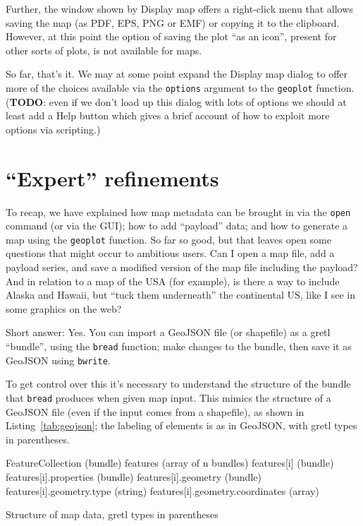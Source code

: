 \documentclass{article}
\begin{document}
Further, the window shown by \textsf{Display map} offers a right-click
menu that allows saving the map (as PDF, EPS, PNG or EMF) or copying
it to the clipboard. However, at this point the option of saving the
plot ``as an icon'', present for other sorts of plots, is not
available for maps.

So far, that's it. We may at some point expand the \textsf{Display
  map} dialog to offer more of the choices available via the
\texttt{options} argument to the \texttt{geoplot}
function. (\textbf{TODO}: even if we don't load up this dialog with
lots of options we should at least add a \textsf{Help} button which
gives a brief account of how to exploit more options via scripting.)

\section{``Expert'' refinements}
\label{sec:expert}

To recap, we have explained how map metadata can be brought in via the
\texttt{open} command (or via the GUI); how to add ``payload'' data;
and how to generate a map using the \texttt{geoplot} function. So far
so good, but that leaves open some questions that might occur to
ambitious users.  Can I open a map file, add a payload series, and
save a modified version of the map file including the payload? And in
relation to a map of the USA (for example), is there a way to include
Alaska and Hawaii, but ``tuck them underneath'' the continental US,
like I see in some graphics on the web?

Short answer: Yes. You can import a GeoJSON file (or shapefile) as a
gretl ``bundle'', using the \texttt{bread} function; make changes to
the bundle, then save it as GeoJSON using \texttt{bwrite}.

To get control over this it's necessary to understand the structure of
the bundle that \texttt{bread} produces when given map input. This
mimics the structure of a GeoJSON file (even if the input comes from a
shapefile), as shown in Listing~\ref{tab:geojson}; the labeling of
elements is as in GeoJSON, with gretl types in parentheses.

\begin{script}[htbp]
\begin{scode}
FeatureCollection (bundle)
  features (array of n bundles)
    features[i] (bundle)
      features[i].properties (bundle)
      features[i].geometry   (bundle)
        features[i].geometry.type (string)
        features[i].geometry.coordinates (array)
\end{scode}
  \caption{Structure of map data, gretl types in parentheses}
  \label{tab:geojson}
\end{script}
\end{document}
